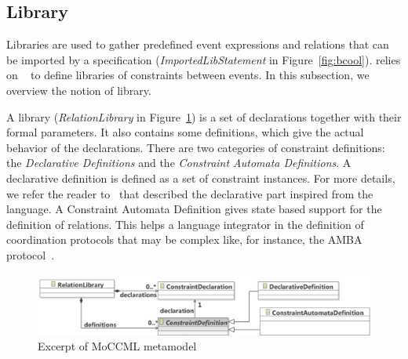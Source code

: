 \subsection{Library}
\label{subsec:bcoollib}

Libraries are used to gather predefined event expressions and relations that can be imported by a \bcool specification (\emph{ImportedLibStatement} in Figure~\ref{fig:bcool}). \bcool relies on \moccml~\cite{moccmlbib} to define libraries of constraints between events. In this subsection, we overview the notion of \moccml library.

A \moccml library (\emph{RelationLibrary} in Figure~\ref{fig:moccml}) is a set of declarations together with their formal parameters. It also contains some definitions, which give the actual behavior of the declarations. There are two categories of constraint definitions: the \emph{Declarative Definitions} and the \emph{Constraint Automata Definitions}. A declarative definition is defined as a set of constraint instances. For more details, we refer the reader to~\cite{moccmloperbib} that described the declarative part inspired from the \ccsl language. A Constraint Automata Definition gives state based support for the definition of relations. This helps a language integrator in the definition of coordination protocols that may be complex like, for instance, the AMBA protocol~\cite{ambabus}. 

\begin{figure}[h]
	\center
	\includegraphics[width=.8\textwidth]{bcool/figs/moccmlmm}
	\caption{Excerpt of MoCCML metamodel}
	\label{fig:moccml}
\end{figure}


